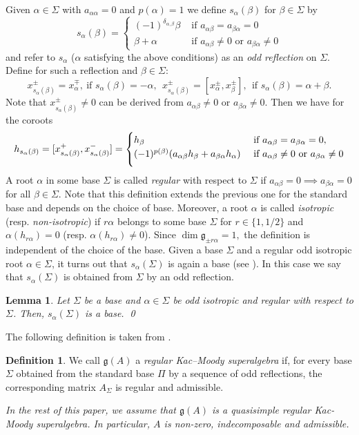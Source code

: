 \documentclass[11pt,reqno]{amsart}
\theoremstyle{plain}
\newtheorem*{lemma}{Lemma}
\theoremstyle{definition}
\newtheorem*{definition}{Definition}
\theoremstyle{remark}
\newcommand{\lie}[1]{\mathfrak{#1}}
\numberwithin{equation}{section}
\begin{document}
Given $\alpha\in\Sigma$ with $a_{\alpha\alpha}=0$ and $p(\alpha)=1$ we define $s_\alpha(\beta)$ for $\beta\in \Sigma$ by
$$s_\alpha(\beta)=\begin{cases}
    (-1)^{\delta_{\alpha,\beta}}\beta & \text{ if } a_{\alpha\beta}=a_{\beta\alpha}=0\\
    \beta+\alpha & \text{ if }a_{\alpha\beta}\neq 0 \text{ or }a_{\beta\alpha}\neq 0
\end{cases}$$
and refer to $s_{\alpha}$ ($\alpha$ satisfying the above conditions) as an \textit{odd reflection} on $\Sigma$. 
Define for such a reflection and $\beta\in \Sigma$:
$$x_{s_{\alpha}(\beta)}^{\pm}=x_\alpha^{\mp}, \ \text{if $s_{\alpha}(\beta)=-\alpha$},\ \ x_{s_{\alpha}(\beta)}^{\pm}=[x_\alpha^{\pm},x_\beta^{\pm}],\ \ \text{if $s_{\alpha}(\beta)=\alpha+\beta$}.$$ Note that $x_{s_{\alpha}(\beta)}^{\pm}\neq 0$ can be derived from $a_{\alpha\beta}\neq 0$ or $a_{\beta\alpha}\neq 0$. Then we have for the coroots
$$h_{s_\alpha(\beta)}=[x_{s_\alpha(\beta)}^{+},x_{s_\alpha(\beta)}^{-}]=\begin{cases}
    h_\beta & \text{ if }a_{\alpha\beta}=a_{\beta\alpha}=0,\\ \vspace{5pt}
   (-1)^{p(\beta)}( a_{\alpha\beta}h_\beta+a_{\beta\alpha}h_\alpha) & \text{ if }a_{\alpha\beta}\neq 0 \text{ or }a_{\beta\alpha}\neq 0
\end{cases}$$
A root $\alpha$ in some base $\Sigma$ is called \textit{regular} with respect to $\Sigma$ if $a_{\alpha\beta}=0\implies a_{\beta\alpha}=0$ for all $\beta\in\Sigma.$ Note that this definition extends the previous one for the standard base and depends on the choice of base. Moreover, a root $\alpha$ is called \textit{isotropic} (resp. \textit{non-isotropic}) if $r\alpha$ belongs to some base $\Sigma$ for $r\in \{1,1/2\}$ and $\alpha(h_{r\alpha})= 0$ (resp. $\alpha(h_{r\alpha})\neq 0$). Since $\dim \lie{g}_{\pm r\alpha}=1,$ the definition is independent of the choice of the base.
Given a base $\Sigma$ and a regular odd isotropic root $\alpha\in \Sigma$, it turns out that $s_\alpha(\Sigma)$ is again a base (see \cite[Lemma 3.1]{Serganova11KacMoody}). In this case we say that $s_\alpha(\Sigma)$ is obtained from $\Sigma$ by an odd reflection.
\begin{lemma}\label{basereg}
   Let $\Sigma$ be a base and $\alpha\in \Sigma$ be odd isotropic and regular with respect to $\Sigma$. Then, $s_\alpha(\Sigma)$ is a base. \qed
\end{lemma}
The following definition is taken from \cite[Section 3]{Serganova11KacMoody}.
\begin{definition}
We call $\mathfrak{g}(A)$ a \emph{regular Kac–Moody superalgebra} if, for every base $\Sigma$ obtained from the standard base $\Pi$ by a sequence of odd reflections, the corresponding matrix $A_{\Sigma}$ is regular and admissible.
\end{definition}
\textit{In the rest of this paper, we assume that $\lie g(A)$ is a quasisimple regular Kac-Moody superalgebra. In particular, $A$ is non-zero, indecomposable and admissible.} 
\end{document}
